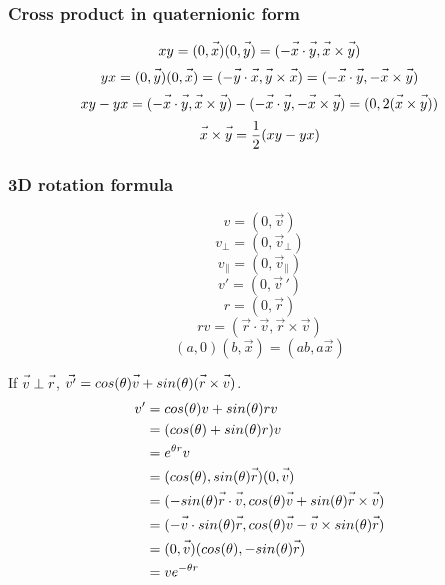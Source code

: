 \documentclass{article}
\newcommand{\fvec}[1]{\vec{\vphantom{A}#1}}
\begin{document}
\subsubsection{Cross product in quaternionic form}
$$ xy = (0, \fvec{x})(0, \fvec{y}) = (-\fvec{x} \cdot \fvec{y}, \fvec{x} \times \fvec{y}) $$
$$ yx = (0, \fvec{y})(0, \fvec{x}) = (-\fvec{y} \cdot \fvec{x}, \fvec{y} \times \fvec{x}) = (-\fvec{x} \cdot \fvec{y}, -\fvec{x} \times \fvec{y}) $$
$$ xy - yx = (-\fvec{x} \cdot \fvec{y}, \fvec{x} \times \fvec{y}) - (-\fvec{x} \cdot \fvec{y}, -\fvec{x} \times \fvec{y}) = (0, 2(\fvec{x} \times \fvec{y})) $$
$$ \fvec{x} \times \fvec{y} = \frac{1}{2}(xy - yx) $$

\subsubsection{3D rotation formula}
\noindent\begin{minipage}{.4\linewidth}
    $$ v = (0, \vec{v}) $$
    $$ v_{\perp} = (0, \vec{v}_{\perp}) $$
    $$ v_{\parallel} = (0, \vec{v}_{\parallel}) $$
    $$ v' = (0, \vec{v}\,') $$
    $$ r = (0, \vec{r}) $$
    $$ rv = (\vec{r} \cdot \vec{v}, \vec{r} \times \vec{v}) $$
    $$ (a, 0)(b, \vec{x}) = (ab, a\vec{x}) $$
\end{minipage}%
\hfill
\begin{minipage}{.6\linewidth}
    If $ \fvec{v} \perp \fvec{r} $, $ \fvec{v^{\prime}} = cos(\theta) \fvec{v} + sin(\theta)(\fvec{r} \times \fvec{v}) $.
    \begin{equation}
    \begin{split}
        v' & = cos(\theta)v + sin(\theta)rv \\
           & = (cos(\theta) + sin(\theta)r)v \\
           & = e^{\theta r}v \\
           & = (cos(\theta), sin(\theta)\fvec{r})(0, \fvec{v}) \\
           & = (-sin(\theta)\fvec{r} \cdot \fvec{v}, cos(\theta) \fvec{v} + sin(\theta)\fvec{r} \times \fvec{v}) \\
           & = (-\fvec{v} \cdot sin(\theta)\fvec{r}, cos(\theta) \fvec{v} - \fvec{v} \times sin(\theta)\fvec{r}) \\
           & = (0, \fvec{v})(cos(\theta), -sin(\theta)\fvec{r}) \\
           & = ve^{-\theta r} \\
    \end{split}
    \end{equation}
\end{minipage}%
\end{document}
